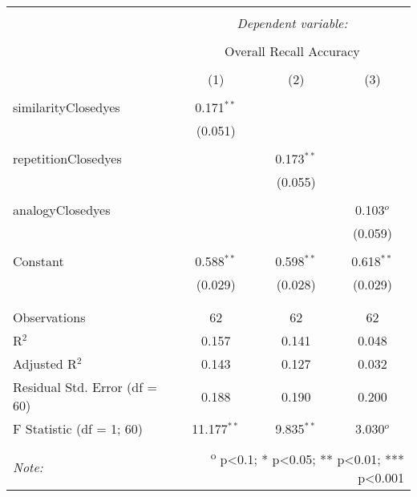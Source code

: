 
\begin{table}[!htbp] \centering 
  \caption{} 
  \label{} 
\begin{tabular}{@{\extracolsep{5pt}}lccc} 
\\[-1.8ex]\hline 
\hline \\[-1.8ex] 
 & \multicolumn{3}{c}{\textit{Dependent variable:}} \\ 
\cline{2-4} 
\\[-1.8ex] & \multicolumn{3}{c}{Overall Recall Accuracy} \\ 
\\[-1.8ex] & (1) & (2) & (3)\\ 
\hline \\[-1.8ex] 
 similarityClosedyes & 0.171$^{**}$ &  &  \\ 
  & (0.051) &  &  \\ 
  & & & \\ 
 repetitionClosedyes &  & 0.173$^{**}$ &  \\ 
  &  & (0.055) &  \\ 
  & & & \\ 
 analogyClosedyes &  &  & 0.103$^{o}$ \\ 
  &  &  & (0.059) \\ 
  & & & \\ 
 Constant & 0.588$^{**}$ & 0.598$^{**}$ & 0.618$^{**}$ \\ 
  & (0.029) & (0.028) & (0.029) \\ 
  & & & \\ 
\hline \\[-1.8ex] 
Observations & 62 & 62 & 62 \\ 
R$^{2}$ & 0.157 & 0.141 & 0.048 \\ 
Adjusted R$^{2}$ & 0.143 & 0.127 & 0.032 \\ 
Residual Std. Error (df = 60) & 0.188 & 0.190 & 0.200 \\ 
F Statistic (df = 1; 60) & 11.177$^{**}$ & 9.835$^{**}$ & 3.030$^{o}$ \\ 
\hline 
\hline \\[-1.8ex] 
\textit{Note:}  & \multicolumn{3}{r}{\textsuperscript{o} p<0.1; * p<0.05; ** p<0.01; *** p<0.001} \\ 
\end{tabular} 
\end{table} 
